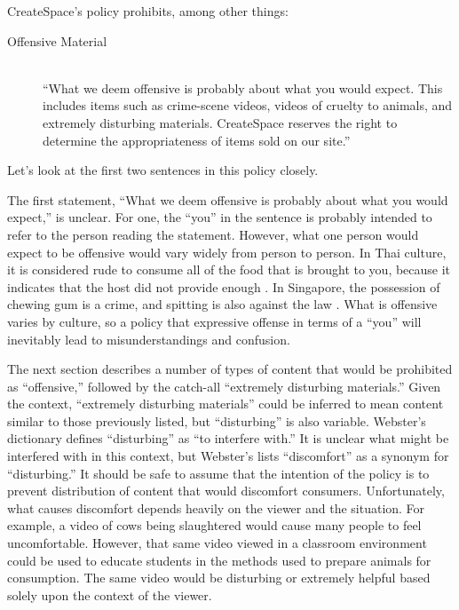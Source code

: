 \documentclass[11pt]{article}
\begin{document}
\begin{multicols}{2}
CreateSpace's policy prohibits, among other things:

\begin{description}
\item[Offensive Material] \hfill \\
      ``What we deem offensive is probably about what you would expect. This includes items such as crime-scene videos, videos of cruelty to animals, and extremely disturbing materials. CreateSpace reserves the right to determine the appropriateness of items sold on our site.''

\end{description}

Let's look at the first two sentences in this policy closely.

The first statement, ``What we deem offensive is probably about what you would expect,'' is unclear.  For one, the ``you'' in the sentence is probably intended to refer to the person reading the statement.  However, what one person would expect to be offensive would vary widely from person to person.  In Thai culture, it is considered rude to consume all of the food that is brought to you, because it indicates that the host did not provide enough \cite{EHowThai}.  In Singapore, the possession of chewing gum is a crime, and spitting is also against the law \cite{HotelTravelSingapore}.  What is offensive varies by culture, so a policy that expressive offense in terms of a ``you'' will inevitably lead to misunderstandings and confusion.

The next section describes a number of types of content that would be prohibited as ``offensive,'' followed by the catch-all ``extremely disturbing materials.'' Given the context, ``extremely disturbing materials'' could be inferred to mean content similar to those previously listed, but ``disturbing'' is also variable.  Webster's dictionary defines ``disturbing'' as ``to interfere with.'' \cite{WebsterOnlineDict}  It is unclear what might be interfered with in this context, but Webster's lists ``discomfort'' as a synonym for ``disturbing.''  It should be safe to assume that the intention of the policy is to prevent distribution of content that would discomfort consumers.  Unfortunately, what causes discomfort depends heavily on the viewer and the situation.  For example, a video of cows being slaughtered would cause many people to feel uncomfortable.  However, that same video viewed in a classroom environment could be used to educate students in the methods used to prepare animals for consumption.  The same video would be disturbing or extremely helpful based solely upon the context of the viewer. 


\end{multicols}
\end{document}
